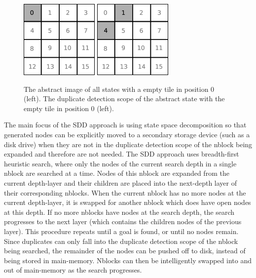 \documentclass{article}
\begin{document}
\begin{figure}[t]
  \begin{center}
    \includegraphics[width=1.5in]{images/tile-abstraction.eps}
    \hspace{4cm}
    \includegraphics[width=1.5in]{images/duplicate-detection-scope.eps}
    \caption{The abstract image of all states with a empty tile in
      position 0 (left).  The duplicate detection scope of the
      abstract state with the empty tile in position 0 (left).}
    \label{fig:tile-abstraction}
  \end{center}
\end{figure}

The main focus of the SDD approach is using state space decomposition
so that generated nodes can be explicitly moved to a secondary storage
device (such as a disk drive) when they are not in the duplicate
detection scope of the nblock being expanded and therefore are not
needed.  The SDD approach uses breadth-first heuristic search, where
only the nodes of the current search depth in a single nblock are
searched at a time.  Nodes of this nblock are expanded from the
current depth-layer and their children are placed into the next-depth
layer of their corresponding nblocks.  When the current nblock has no
more nodes at the current depth-layer, it is swapped for another
nblock which does have open nodes at this depth.  If no more nblocks
have nodes at the search depth, the search progresses to the next
layer (which contains the children nodes of the previous layer).  This
procedure repeats until a goal is found, or until no nodes
remain. Since duplicates can only fall into the duplicate detection
scope of the nblock being searched, the remainder of the nodes can be
pushed off to disk, instead of being stored in main-memory.  Nblocks
can then be intelligently swapped into and out of main-memory as the
search progresses.
\end{document}
